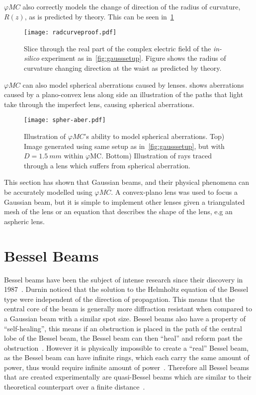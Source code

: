 $\varphi MC$ also correctly models the change of direction of the radius of curvature, $R(z)$, as is predicted by theory.
This can be seen in~\cref{fig:proofchgrz}

\begin{figure}[!htpb]
    \centering
    \texttt{[image: radcurveproof.pdf]}
    \caption{Slice through the real part of the complex electric field of the \textit{in-silico} experiment as in~\cref{fig:gausssetup}. Figure shows the radius of curvature changing direction at the waist as predicted by theory.}
    \label{fig:proofchgrz}
\end{figure}

$\varphi MC$ can also model spherical aberrations caused by lenses.
 shows aberrations caused by a plano-convex lens along side an illustration of the paths that light take through the imperfect lens, causing spherical aberrations.

\begin{figure}[!hbtp]
    \centering
    \texttt{[image: spher-aber.pdf]}
    \caption{Illustration of $\varphi MC$'s ability to model spherical aberrations. Top) Image generated using same setup as in~\cref{fig:gausssetup}, but with $D=1.5~mm$ within $\varphi$MC. Bottom) Illustration of rays traced through a lens which suffers from spherical aberration.}
    \label{fig:spheraberr}
\end{figure}


This section has shown that Gaussian beams, and their physical phenomena can be accurately modelled using $\varphi MC$.
A convex-plano lens was used to focus a Gaussian beam, but it is simple to implement other lenses given a triangulated mesh of the lens or an equation that describes the shape of the lens, e.g an aspheric lens.
\FloatBarrier

\section{Bessel Beams}

Bessel beams have been the subject of intense research since their discovery in 1987~\cite{durnin1987diffraction,durnin1987exact}. 
Durnin noticed that the solution to the Helmholtz equation of the Bessel type were independent of the direction of propagation.
This means that the central core of the beam is generally more diffraction resistant when compared to a Gaussian beam with a similar spot size.
Bessel beams also have a property of ``self-healing'', this means if an obstruction is placed in the path of the central lobe of the Bessel beam, the Bessel beam can then ``heal'' and reform past the obstruction~\cite{mcgloin2005bessel}.
However it is physically impossible to create a ``real'' Bessel beam, as the Bessel beam can have infinite rings, which each carry the same amount of power, thus would require infinite amount of power~\cite{durnin1987diffraction}.
Therefore all Bessel beams that are created experimentally are quasi-Bessel beams which are similar to their theoretical counterpart over a finite distance~\cite{durnin1987diffraction}.



